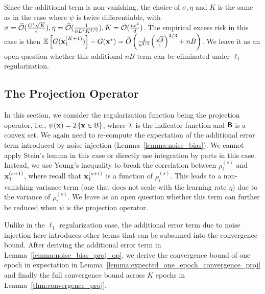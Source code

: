 Since the additional term is non-vanishing, the choice of $\sigma, \eta$ and $K$ is the same as in the case where $\psi$ is twice differentiable, with $\sigma = \widetilde{{\mathcal{O}}}(\frac{G^{*}\sqrt{K}}{{\epsilon}}), \eta = \widetilde{{\mathcal{O}}}(\frac{1}{n L^{*}K^{1/3}}), K= {\mathcal{O}}(\frac{n{\epsilon}^2}{d})$.
The empirical excess risk in this case is then $\mathbb{E}\left[G({\mathbf{x}}_1^{(K+1)})\right] - G({\mathbf{x}}^*) = \widetilde{O}\left(\frac{1}{n^{2/3}} \Big( \frac{\sqrt{d}}{{\epsilon}} \Big)^{4/3} + nB \right)$.
We leave it as an open question whether this additional $nB$ term can be  eliminated under $\ell_1$ regularization.




\subsection{The Projection Operator}
\label{subsec:appendix_proj_op}

In this section, we consider the regularization function being the projection operator, i.e., $\psi({\mathbf{x}}) = {\mathcal{I}}\{{\mathbf{x}} \in {\mathsf{B}}\}$, where ${\mathcal{I}}$ is the indicator function and ${\mathsf{B}}$ is a convex set.
We again need to re-compute the expectation of the additional error term introduced by noise injection (Lemma~\ref{lemma:noise_bias}).
We cannot apply Stein's lemma in this case or directly use integration by parts in this case. Instead, we use Young's inequality to break the correlation between $\rho_i^{(s)}$ and ${\mathbf{x}}_1^{(s+1)}$, where recall that ${\mathbf{x}}_1^{(s+1)}$ is a function of $\rho_i^{(s)}$. This leads to a non-vanishing variance term (one that does not scale with the learning rate $\eta$) due to the variance of $\rho_i^{(s)}$. We leave as an open question whether this term can further be reduced when $\psi$ is the projection operator.

Unlike in the $\ell_1$ regularization case, the additional error term due to noise injection here introduces other terms that can be subsumed into the convergence bound. 
After deriving the additional error term in Lemma~\ref{lemma:noise_bias_proj_op}, we derive the convergence bound of one epoch in expectation in Lemma~\ref{lemma:expected_one_epoch_convergence_proj}
and finally the full convergence bound across $K$ epochs in Lemma~\ref{thm:convergence_proj}.


